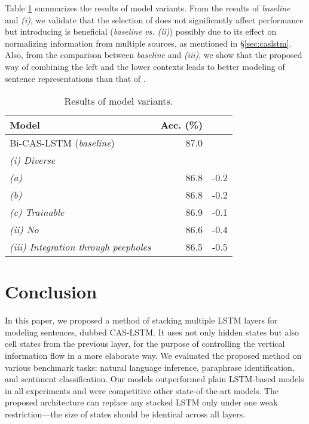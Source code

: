 \documentclass[wcp]{jmlr}
\begin{document}
    Table \ref{table:variations} summarizes the results of model variants.
    From the results of \textit{baseline} and \textit{(i)}, we validate that the selection of  does not significantly affect performance but introducing  is beneficial (\textit{baseline vs. (ii)}) possibly due to its effect on normalizing information from multiple sources, as mentioned in \S\ref{sec:caslstm}.
    Also, from the comparison between  \textit{baseline} and \textit{(iii)}, we show that the proposed way of combining the left and the lower contexts leads to better modeling of sentence representations than that of \citet{zhang2016highway}.
    
    \begin{table}[t]
        \centering
        \begin{tabular}{l r r}
            \hline
            \bf{Model} & \bf{Acc. (\%)} & \bf{} \\
            \hline
            Bi-CAS-LSTM (\textit{baseline}) & 87.0 & \\
            \quad \textit{(i) Diverse } & & \\
            \qquad \textit{(a) } & 86.8 & -0.2 \\
            \qquad \textit{(b) } &  86.8 & -0.2 \\
            \qquad \textit{(c) Trainable } & 86.9 & -0.1 \\
            \quad \textit{(ii) No } & 86.6 & -0.4 \\
            \quad \textit{(iii) Integration through peepholes} & 86.5 & -0.5 \\
            \hline
        \end{tabular}
        \caption{Results of model variants.}
        \label{table:variations}
    \end{table}
    
    \section{Conclusion}
    \label{sec:conclusion}
    In this paper, we proposed a method of stacking multiple LSTM layers for modeling sentences, dubbed CAS-LSTM.
    It uses not only hidden states but also cell states from the previous layer, for the purpose of controlling the vertical information flow in a more elaborate way.
    We evaluated the proposed method on various benchmark tasks: natural language inference, paraphrase identification, and sentiment classification.
    Our models outperformed plain LSTM-based models in all experiments and were competitive other state-of-the-art models.
    The proposed architecture can replace any stacked LSTM only under one weak restriction---the size of states should be identical across all layers.
    
\end{document}
